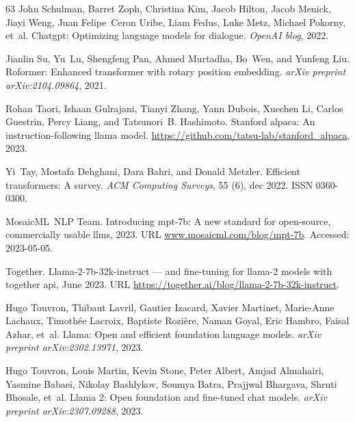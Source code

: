 \documentclass{article} \usepackage{iclr2024_conference,times}
\begin{document}
\begin{thebibliography}{63}
John Schulman, Barret Zoph, Christina Kim, Jacob Hilton, Jacob Menick, Jiayi
  Weng, Juan Felipe~Ceron Uribe, Liam Fedus, Luke Metz, Michael Pokorny, et~al.
\newblock Chatgpt: Optimizing language models for dialogue.
\newblock \emph{OpenAI blog}, 2022.

Jianlin Su, Yu~Lu, Shengfeng Pan, Ahmed Murtadha, Bo~Wen, and Yunfeng Liu.
\newblock Roformer: Enhanced transformer with rotary position embedding.
\newblock \emph{arXiv preprint arXiv:2104.09864}, 2021.

Rohan Taori, Ishaan Gulrajani, Tianyi Zhang, Yann Dubois, Xuechen Li, Carlos
  Guestrin, Percy Liang, and Tatsunori~B. Hashimoto.
\newblock Stanford alpaca: An instruction-following llama model.
\newblock \url{https://github.com/tatsu-lab/stanford_alpaca}, 2023.

Yi~Tay, Mostafa Dehghani, Dara Bahri, and Donald Metzler.
\newblock Efficient transformers: A survey.
\newblock \emph{ACM Computing Surveys}, 55 (6), dec 2022.
\newblock ISSN 0360-0300.

MosaicML~NLP Team.
\newblock Introducing mpt-7b: A new standard for open-source, commercially
  usable llms, 2023.
\newblock URL \url{www.mosaicml.com/blog/mpt-7b}.
\newblock Accessed: 2023-05-05.

Together.
\newblock Llama-2-7b-32k-instruct — and fine-tuning for llama-2 models with
  together api, June 2023.
\newblock URL \url{https://together.ai/blog/llama-2-7b-32k-instruct}.

Hugo Touvron, Thibaut Lavril, Gautier Izacard, Xavier Martinet, Marie-Anne
  Lachaux, Timoth{\'e}e Lacroix, Baptiste Rozi{\`e}re, Naman Goyal, Eric
  Hambro, Faisal Azhar, et~al.
\newblock Llama: Open and efficient foundation language models.
\newblock \emph{arXiv preprint arXiv:2302.13971}, 2023{}.

Hugo Touvron, Louis Martin, Kevin Stone, Peter Albert, Amjad Almahairi, Yasmine
  Babaei, Nikolay Bashlykov, Soumya Batra, Prajjwal Bhargava, Shruti Bhosale,
  et~al.
\newblock Llama 2: Open foundation and fine-tuned chat models.
\newblock \emph{arXiv preprint arXiv:2307.09288}, 2023{}.


\end{thebibliography}
\end{document}
